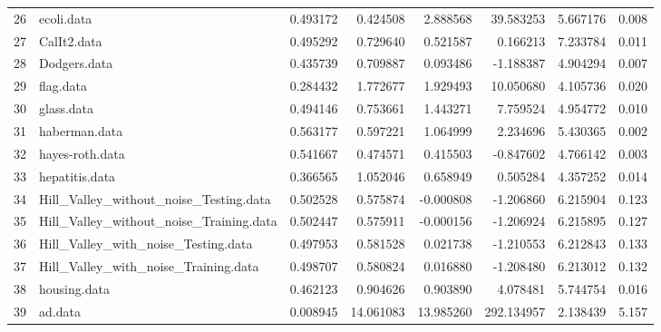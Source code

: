 \begin{table}
{\begin{tabular}{llrrrrrr}
26 &                               ecoli.data &       0.493172 &               0.424508 &   2.888568 &   39.583253 &  5.667176 &        0.008 \\
27 &                              CalIt2.data &       0.495292 &               0.729640 &   0.521587 &    0.166213 &  7.233784 &        0.011 \\
28 &                             Dodgers.data &       0.435739 &               0.709887 &   0.093486 &   -1.188387 &  4.904294 &        0.007 \\
29 &                                flag.data &       0.284432 &               1.772677 &   1.929493 &   10.050680 &  4.105736 &        0.020 \\
30 &                               glass.data &       0.494146 &               0.753661 &   1.443271 &    7.759524 &  4.954772 &        0.010 \\
31 &                            haberman.data &       0.563177 &               0.597221 &   1.064999 &    2.234696 &  5.430365 &        0.002 \\
32 &                          hayes-roth.data &       0.541667 &               0.474571 &   0.415503 &   -0.847602 &  4.766142 &        0.003 \\
33 &                           hepatitis.data &       0.366565 &               1.052046 &   0.658949 &    0.505284 &  4.357252 &        0.014 \\
34 &   Hill\_Valley\_without\_noise\_Testing.data &       0.502528 &               0.575874 &  -0.000808 &   -1.206860 &  6.215904 &        0.123 \\
35 &  Hill\_Valley\_without\_noise\_Training.data &       0.502447 &               0.575911 &  -0.000156 &   -1.206924 &  6.215895 &        0.127 \\
36 &      Hill\_Valley\_with\_noise\_Testing.data &       0.497953 &               0.581528 &   0.021738 &   -1.210553 &  6.212843 &        0.133 \\
37 &     Hill\_Valley\_with\_noise\_Training.data &       0.498707 &               0.580824 &   0.016880 &   -1.208480 &  6.213012 &        0.132 \\
38 &                             housing.data &       0.462123 &               0.904626 &   0.903890 &    4.078481 &  5.744754 &        0.016 \\
39 &                                  ad.data &       0.008945 &              14.061083 &  13.985260 &  292.134957 &  2.138439 &        5.157 \\

\end{tabular}}
\end{table}
